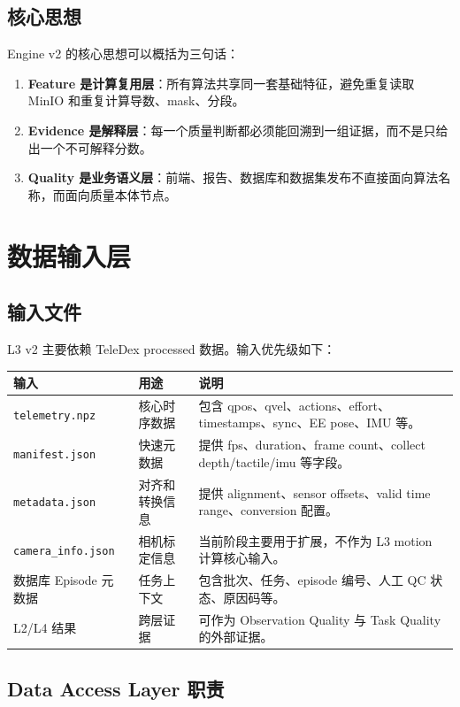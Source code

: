 \documentclass[UTF8,zihao=-4,oneside,openany]{ctexrep}
\newcommand{\Code}[1]{\texttt{#1}}
\newcommand{\Term}[1]{\textbf{#1}}
\begin{document}
\subsection{核心思想}

Engine v2 的核心思想可以概括为三句话：

\begin{enumerate}
\item \Term{Feature 是计算复用层}：所有算法共享同一套基础特征，避免重复读取 MinIO 和重复计算导数、mask、分段。
\item \Term{Evidence 是解释层}：每一个质量判断都必须能回溯到一组证据，而不是只给出一个不可解释分数。
\item \Term{Quality 是业务语义层}：前端、报告、数据库和数据集发布不直接面向算法名称，而面向质量本体节点。
\end{enumerate}

\section{数据输入层}

\subsection{输入文件}

L3 v2 主要依赖 TeleDex processed 数据。输入优先级如下：

\begin{longtable}{L{4cm} L{4cm} L{6cm}}
\toprule
输入 & 用途 & 说明 \\
\midrule
\Code{telemetry.npz} & 核心时序数据 & 包含 qpos、qvel、actions、effort、timestamps、sync、EE pose、IMU 等。 \\
\Code{manifest.json} & 快速元数据 & 提供 fps、duration、frame count、collect depth/tactile/imu 等字段。 \\
\Code{metadata.json} & 对齐和转换信息 & 提供 alignment、sensor offsets、valid time range、conversion 配置。 \\
\Code{camera\_info.json} & 相机标定信息 & 当前阶段主要用于扩展，不作为 L3 motion 计算核心输入。 \\
数据库 Episode 元数据 & 任务上下文 & 包含批次、任务、episode 编号、人工 QC 状态、原因码等。 \\
L2/L4 结果 & 跨层证据 & 可作为 Observation Quality 与 Task Quality 的外部证据。 \\
\bottomrule
\end{longtable}

\subsection{Data Access Layer 职责}
\end{document}
